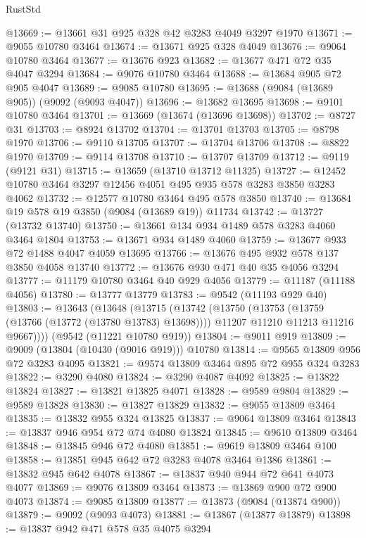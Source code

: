 \begin{lexlean}{RustStd}
\begin{coremodule}
@13669 := @13661 @31 @925 @328 @42 @3283 @4049 @3297 @1970
@13671 := @9055 @10780 @3464
@13674 := @13671 @925 @328 @4049
@13676 := @9064 @10780 @3464
@13677 := @13676 @923
@13682 := @13677 @471 @72 @35 @4047 @3294
@13684 := @9076 @10780 @3464
@13688 := @13684 @905 @72 @905 @4047
@13689 := @9085 @10780
@13695 := @13688 (@9084 (@13689 @905)) (@9092 (@9093 @4047))
@13696 := @13682 @13695
@13698 := @9101 @10780 @3464
@13701 := @13669 (@13674 (@13696 @13698))
@13702 := @8727 @31
@13703 := @8924 @13702
@13704 := @13701 @13703
@13705 := @8798 @1970
@13706 := @9110 @13705
@13707 := @13704 @13706
@13708 := @8822 @1970
@13709 := @9114 @13708
@13710 := @13707 @13709
@13712 := @9119 (@9121 @31)
@13715 := @13659 (@13710 @13712 @11325)
@13727 := @12452 @10780 @3464 @3297 @12456 @4051 @495 @935 @578 @3283 @3850 @3283 @4062
@13732 := @12577 @10780 @3464 @495 @578 @3850
@13740 := @13684 @19 @578 @19 @3850 (@9084 (@13689 @19)) @11734
@13742 := @13727 (@13732 @13740)
@13750 := @13661 @134 @934 @1489 @578 @3283 @4060 @3464 @1804
@13753 := @13671 @934 @1489 @4060
@13759 := @13677 @933 @72 @1488 @4047 @4059 @13695
@13766 := @13676 @495 @932 @578 @137 @3850 @4058 @13740
@13772 := @13676 @930 @471 @40 @35 @4056 @3294
@13777 := @11179 @10780 @3464 @40 @929 @4056
@13779 := @11187 (@11188 @4056)
@13780 := @13777 @13779
@13783 := @9542 (@11193 @929 @40)
@13803 := @13643
    (@13648
      (@13715
        (@13742
          (@13750
            (@13753 (@13759 (@13766 (@13772 (@13780 @13783) @13698))))
            @11207
            @11210
            @11213
            @11216
            @9667))))
    (@9542 (@11221 @10780 @919))
@13804 := @9011 @919
@13809 := @9009 (@13804 (@10430 (@9016 @919))) @10780
@13814 := @9565 @13809 @956 @72 @3283 @4095
@13821 := @9574 @13809 @3464 @895 @72 @955 @324 @3283
@13822 := @3290 @4080
@13824 := @3290 @4087 @4092
@13825 := @13822 @13824
@13827 := @13821 @13825 @4071
@13828 := @9589 @9804
@13829 := @9589 @13828
@13830 := @13827 @13829
@13832 := @9055 @13809 @3464
@13835 := @13832 @955 @324 @13825
@13837 := @9064 @13809 @3464
@13843 := @13837 @946 @954 @72 @74 @4080 @13824
@13845 := @9610 @13809 @3464
@13848 := @13845 @946 @72 @4080
@13851 := @9619 @13809 @3464 @100
@13858 := @13851 @945 @642 @72 @3283 @4078 @3464 @1386
@13861 := @13832 @945 @642 @4078
@13867 := @13837 @940 @944 @72 @641 @4073 @4077
@13869 := @9076 @13809 @3464
@13873 := @13869 @900 @72 @900 @4073
@13874 := @9085 @13809
@13877 := @13873 (@9084 (@13874 @900))
@13879 := @9092 (@9093 @4073)
@13881 := @13867 (@13877 @13879)
@13898 := @13837
    @942
    @471
    @578
    @35
    @4075
    @3294

\end{coremodule}
\end{lexlean}
